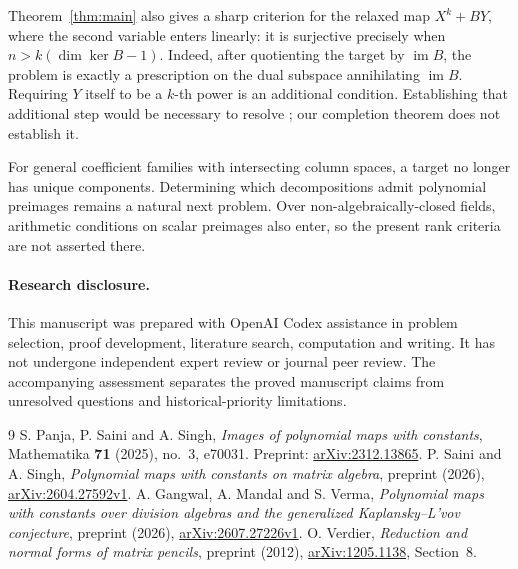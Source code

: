 \documentclass[11pt]{article}
\theoremstyle{remark}\newtheorem{remark}[theorem]{Remark}
\newcommand{\im}{\operatorname{im}}
\begin{document}
Theorem~\ref{thm:main} also gives a sharp criterion for the relaxed map $X^k+BY$, where the second variable enters linearly: it is surjective precisely when $n>k(\dim\ker B-1)$. Indeed, after quotienting the target by $\im B$, the problem is exactly a prescription on the dual subspace annihilating $\im B$. Requiring $Y$ itself to be a $k$-th power is an additional condition. Establishing that additional step would be necessary to resolve \cite[Question 6.1]{SS}; our completion theorem does not establish it.

For general coefficient families with intersecting column spaces, a target no longer has unique components. Determining which decompositions admit polynomial preimages remains a natural next problem. Over non-algebraically-closed fields, arithmetic conditions on scalar preimages also enter, so the present rank criteria are not asserted there.

\paragraph{Research disclosure.}
This manuscript was prepared with OpenAI Codex assistance in problem selection, proof development, literature search, computation and writing. It has not undergone independent expert review or journal peer review. The accompanying assessment separates the proved manuscript claims from unresolved questions and historical-priority limitations.

\begin{thebibliography}{9}
 S. Panja, P. Saini and A. Singh, \emph{Images of polynomial maps with constants}, Mathematika \textbf{71} (2025), no.~3, e70031. Preprint: \href{https://arxiv.org/abs/2312.13865}{arXiv:2312.13865}.
 P. Saini and A. Singh, \emph{Polynomial maps with constants on matrix algebra}, preprint (2026), \href{https://arxiv.org/abs/2604.27592v1}{arXiv:2604.27592v1}.
 A. Gangwal, A. Mandal and S. Verma, \emph{Polynomial maps with constants over division algebras and the generalized Kaplansky--L'vov conjecture}, preprint (2026), \href{https://arxiv.org/abs/2607.27226v1}{arXiv:2607.27226v1}.
 O. Verdier, \emph{Reduction and normal forms of matrix pencils}, preprint (2012), \href{https://arxiv.org/abs/1205.1138}{arXiv:1205.1138}, Section~8.
\end{thebibliography}
\end{document}
